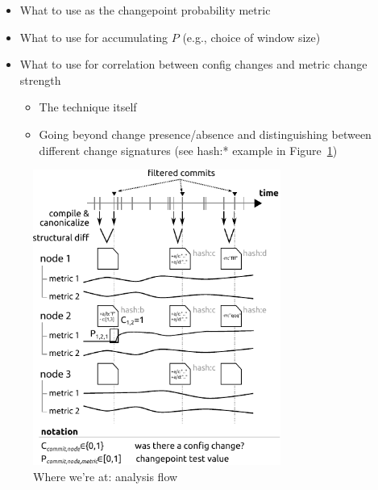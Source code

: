 \documentclass[twocolumn]{article}
\begin{document}
\begin{itemize}
\item What to use as the changepoint probability metric
\item What to use for accumulating $P$ (e.g., choice of window size)
\item What to use for correlation between config changes and metric change strength
	\begin{itemize}
	\item The technique itself
	\item Going beyond change presence/absence and distinguishing between different change signatures (see \textsf{hash:*} example in Figure~\ref{fig:analysis-flow}) 
	\end{itemize}
\end{itemize}

\begin{figure}[!t]
\includegraphics[width=3.2in]{analysis-flow.pdf}
\caption{Where we're at: analysis flow}
\label{fig:analysis-flow}
\end{figure}
\end{document}
